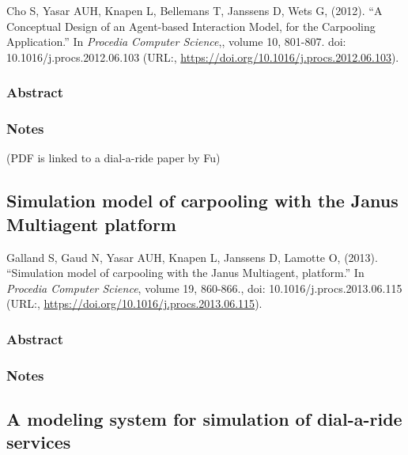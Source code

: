 \documentclass[]{article}
\begin{document}
Cho S, Yasar AUH, Knapen L, Bellemans T, Janssens D, Wets G, (2012). ``A
Conceptual Design of an Agent-based Interaction Model, for the
Carpooling Application.'' In \emph{Procedia Computer Science},, volume
10, 801-807. doi: 10.1016/j.procs.2012.06.103 (URL:,
\url{https://doi.org/10.1016/j.procs.2012.06.103}).

\hypertarget{abstract-19}{%
\subsubsection{Abstract}\label{abstract-19}}

\hypertarget{notes-19}{%
\subsubsection{Notes}\label{notes-19}}

(PDF is linked to a dial-a-ride paper by Fu)

\hypertarget{simulation-model-of-carpooling-with-the-janus-multiagent-platform}{%
\subsection{Simulation model of carpooling with the Janus Multiagent
platform}\label{simulation-model-of-carpooling-with-the-janus-multiagent-platform}}

Galland S, Gaud N, Yasar AUH, Knapen L, Janssens D, Lamotte O, (2013).
``Simulation model of carpooling with the Janus Multiagent, platform.''
In \emph{Procedia Computer Science}, volume 19, 860-866., doi:
10.1016/j.procs.2013.06.115 (URL:,
\url{https://doi.org/10.1016/j.procs.2013.06.115}).

\hypertarget{abstract-20}{%
\subsubsection{Abstract}\label{abstract-20}}

\hypertarget{notes-20}{%
\subsubsection{Notes}\label{notes-20}}

\hypertarget{a-modeling-system-for-simulation-of-dial-a-ride-services}{%
\subsection{A modeling system for simulation of dial-a-ride
services}\label{a-modeling-system-for-simulation-of-dial-a-ride-services}}
\end{document}
